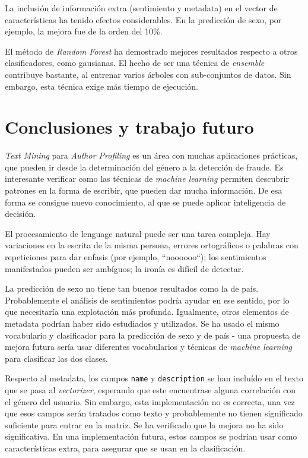 \documentclass[11pt,a4paper]{article}
\begin{document}
  La inclusi\'on de informaci\'on extra (sentimiento y metadata) en el vector de caracter\'isticas ha tenido efectos considerables. En la predicci\'on de sexo, por ejemplo, la mejora fue de la orden del 10\%. 

  El m\'etodo de {\em Random Forest} ha demostrado mejores resultados respecto a otros clasificadores, como gausianas. El hecho de ser una t\'ecnica de {\em ensemble} contribuye bastante, al entrenar varios \'arboles con sub-conjuntos de datos. Sin embargo, esta t\'ecnica exige m\'as tiempo de ejecuci\'on.


\section{Conclusiones y trabajo futuro}
  
  {\em Text Mining} para {\em Author Profiling} es un \'area con muchas aplicaciones pr\'acticas, que pueden ir desde la determinaci\'on del g\'enero a la detecci\'on de fraude. Es interesante verificar como las t\'ecnicas de {\em machine learning} permiten descubrir patrones en la forma de escribir, que pueden dar mucha informaci\'on. De esa forma se consigue nuevo conocimiento, al que se puede aplicar inteligencia de decisi\'on.

  El procesamiento de lenguage natural puede ser una tarea compleja. Hay variaciones en la escrita de la misma persona, errores ortogr\'aficos o palabras con repeticiones para dar enfasis (por ejemplo, ``noooooo``); los sentimientos manifestados pueden ser amb\'iguos; la iron\'ia es dif\'icil de detectar. 

  La predicci\'on de sexo no tiene tan buenos resultados como la de pa\'is. Probablemente el an\'alisis de sentimientos podr\'ia ayudar en ese sentido, por lo que necesitar\'ia una explotaci\'on m\'as profunda. Igualmente, otros elementos de metadata podr\'ian haber sido estudiados y utilizados. Se ha usado el mismo vocabulario y clasificador para la predicci\'on de sexo y de pa\'is - una propuesta de mejora futura ser\'ia usar diferentes vocabularios y t\'ecnicas de {\em machine learning} para clasificar las dos clases.

  Respecto al metadata, los campos {\tt name} y {\tt description} se han inclu\'ido en el texto que se pasa al {\em vectorizer}, esperando que este encuentrase alguna correlaci\'on con el g\'enero del usuario. Sin embargo, esta implementaci\'on no es correcta, una vez que esos campos ser\'an tratados como texto y probablemente no tienen significado suficiente para entrar en la matriz. Se ha verificado que la mejora no ha sido significativa. En una implementaci\'on futura, estos campos se podr\'ian usar como caracter\'isticas extra, para asegurar que se usan en la clasificaci\'on.
  
\end{document}
